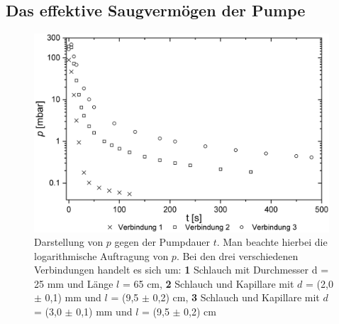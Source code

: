 \documentclass[a4paper,usenatbib]{aspdoc}
\begin{document}
        \subsection{Das effektive Saugvermögen der Pumpe}
            \begin{figure}
                \centering
                \includegraphics[width=110mm]{graphs/saug1.png}
                \caption{
                    Darstellung von $p$ gegen der Pumpdauer $t$. Man beachte hierbei die logarithmische Auftragung von $p$. Bei den drei verschiedenen Verbindungen handelt es sich um: \textbf{1} Schlauch mit Durchmesser d = 25 mm und Länge $l$ = 65 cm, \textbf{2} Schlauch und Kapillare mit $d$ = (2,0 $\pm$ 0,1) mm und $l$ = (9,5 $\pm$ 0,2) cm, \textbf{3} Schlauch und Kapillare mit $d$ = (3,0 $\pm$ 0,1) mm und $l$ = (9,5 $\pm$ 0,2) cm
                }
                \label{fig:saugEff}
            \end{figure}
        
\end{document}
